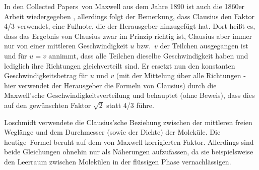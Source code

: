 In den \glqq Collected Papers\grqq\ von Maxwell aus dem Jahre 1890 ist auch die 1860er Arbeit 
wiedergegeben \cite{Maxwell90},
allerdings  folgt der Bemerkung, dass Clausius den Faktor 4/3 verwendet, eine Fu\ss note, die der
Herausgeber hinzugef\"ugt hat. Dort hei\ss t es, dass das Ergebnis von Clausius zwar im Prinzip richtig ist, 
Clausius aber immer nur von einer mittleren Geschwindigkeit $u$ bzw.\ $v$ der Teilchen ausgegangen ist und
f\"ur $u=v$ annimmt, dass alle Teilchen dieselbe Geschwindigkeit haben und lediglich ihre Richtungen
gleichverteilt sind. Er ersetzt nun den konstanten Geschwindigkeitsbetrag f\"ur $u$ und $v$ (mit der Mittelung \"uber alle
Richtungen - hier verwendet der Herausgeber die Formeln von Clausius) durch die Maxwell'sche 
Geschwindigkeitsverteilung und behauptet (ohne Beweis), dass dies auf den gew\"unschten Faktor $\sqrt{2}$
statt 4/3 f\"uhre. 



Loschmidt verwendete die Clausius'sche Beziehung zwischen der mittleren freien
Wegl\"ange und dem Durchmesser (sowie der Dichte) der Molek\"ule. Die \glqq heutige\grqq\ Formel
beruht auf dem von Maxwell korrigierten Faktor. Allerdings sind beide Gleichungen ohnehin nur als
N\"aherungen aufzufassen, da sie beispielsweise den Leerraum zwischen Molek\"ulen in der fl\"ussigen
Phase vernachl\"assigen. 

